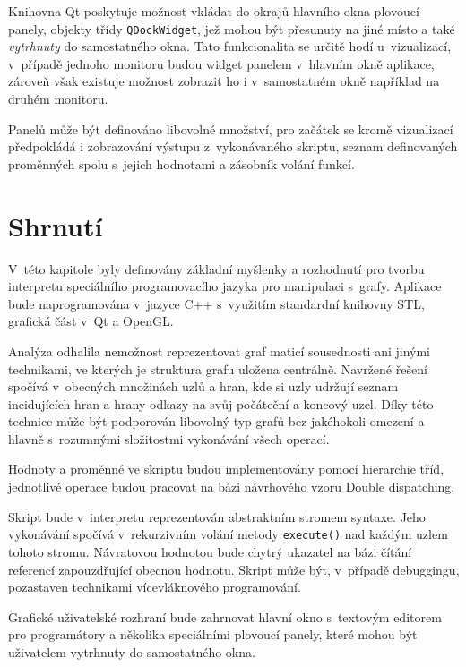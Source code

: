 \documentclass[11pt,twoside,a4paper]{book}
\begin{document}
Knihovna Qt poskytuje možnost vkládat do okrajů hlavního okna plovoucí panely, objekty třídy \texttt{QDockWidget}, jež mohou být přesunuty na jiné místo a také \textit{vytrhnuty} do samostatného okna. Tato funkcionalita se určitě hodí u~vizualizací, v~případě jednoho monitoru budou widget panelem v~hlavním okně aplikace, zároveň však existuje možnost zobrazit ho i v~samostatném okně například na druhém monitoru.

Panelů může být definováno libovolné množství, pro začátek se kromě vizualizací před\-po\-klá\-dá i zobrazování výstupu z~vykonávaného skriptu, seznam definovaných proměnných spolu s~jejich hodnotami a zásobník volání funkcí.


\section{Shrnutí}

V~této kapitole byly definovány základní myšlenky a rozhodnutí pro tvorbu interpretu spe\-ci\-ál\-ní\-ho programovacího jazyka pro manipulaci s~grafy. Aplikace bude naprogramována v~jazyce C++ s~využitím standardní knihovny STL, grafická část v~Qt a OpenGL.

Analýza odhalila nemožnost reprezentovat graf maticí sousednosti ani jinými technikami, ve kterých je struktura grafu uložena centrálně. Navržené řešení spočívá v~obecných množinách uzlů a hran, kde si uzly udržují seznam incidujících hran a hrany odkazy na svůj počáteční a koncový uzel. Díky této technice může být podporován libovolný typ grafů bez jakéhokoli omezení a hlavně s~rozumnými složitostmi vykonávání všech operací.

Hodnoty a proměnné ve skriptu budou implementovány pomocí hierarchie tříd, jednotlivé operace budou pracovat na bázi návrhového vzoru Double dispatching.

Skript bude v~interpretu reprezentován abstraktním stromem syntaxe. Jeho vykonávání spočívá v~rekurzivním volání metody \texttt{execute()} nad každým uzlem tohoto stromu. Ná\-vra\-to\-vou hodnotou bude chytrý ukazatel na bázi čítání referencí zapouzdřující obecnou hodnotu. Skript může být, v~případě debuggingu, pozastaven technikami ví\-ce\-vlák\-no\-vé\-ho programování.

Grafické uživatelské rozhraní bude zahrnovat hlavní okno s~textovým editorem pro programátory a několika speciálními plovoucí panely, které mohou být uživatelem vytrhnuty do samostatného okna.


\end{document}
